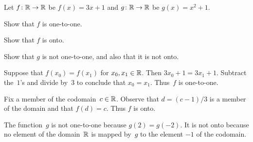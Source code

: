 \documentclass{test}  %
\begin{document}
\begin{ex} Let $\mbox{$f\colon \mathbb{R}\to \mathbb{R}$}$ be $f(x)=3x+1$ and 
  $\mbox{$g\colon \mathbb{R}\to \mathbb{R}$}$ be $g(x)=x^2+1$.
\begin{exes}
\item Show that $f$ is one-to-one.
\item Show that $f$ is onto.    
\item Show that $g$ is not one-to-one, and also that it is not onto.
\end{exes}
\begin{ans}
\begin{exes}
\item Suppose that $f(x_0)=f(x_1)$ for $x_0,x_1\in\mathbb{R}$.
  Then $3x_0+1=3x_1+1$.
  Subtract the~$1$'s and divide by~$3$ to conclude that $x_0=x_1$.
  Thus~$f$ is one-to-one. 
\item Fix a member of the codomain~$c\in\mathbb{R}$.
  Observe that $d=(c-1)/3$ is a member of the domain and that 
  $f(d)=c$.
  Thus $f$ is onto.
\item The function~$g$ is not one-to-one because $g(2)=g(-2)$.
  It is not onto because no element of the domain~$\mathbb{R}$ is mapped by~$g$
  to the element $-1$ of the codomain.        
\end{exes}
\end{ans}
\end{ex}
\end{document}
